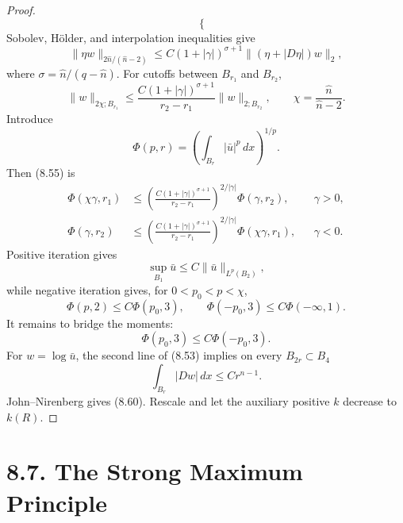 \begin{proof}
\begin{equation}
\begin{cases}
\end{cases}
\end{equation}
Sobolev, H\"older, and interpolation inequalities give
\begin{equation}
\tag{8.54}
\|\eta w\|_{2\widehat n/(\widehat n-2)}
\leq C(1+|\gamma|)^{\sigma+1}
\|(\eta+|D\eta|)w\|_2,
\end{equation}
where $\sigma=\widehat n/(q-\widehat n)$. For cutoffs between
$B_{r_1}$ and $B_{r_2}$,
\begin{equation}
\tag{8.55}
\|w\|_{2\chi;B_{r_1}}
\leq\frac{C(1+|\gamma|)^{\sigma+1}}{r_2-r_1}
\|w\|_{2;B_{r_2}},
\qquad\chi=\frac{\widehat n}{\widehat n-2}.
\end{equation}
Introduce
\begin{equation}
\tag{8.56}
\Phi(p,r)=\left(\int_{B_r}|\bar u|^p\,dx\right)^{1/p}.
\end{equation}
Then (8.55) is
\begin{equation}
\tag{8.57}
\begin{aligned}
\Phi(\chi\gamma,r_1)&\leq
\left(\frac{C(1+|\gamma|)^{\sigma+1}}{r_2-r_1}\right)^{2/|\gamma|}
\Phi(\gamma,r_2),&&\gamma>0,\\
\Phi(\gamma,r_2)&\leq
\left(\frac{C(1+|\gamma|)^{\sigma+1}}{r_2-r_1}\right)^{2/|\gamma|}
\Phi(\chi\gamma,r_1),&&\gamma<0.
\end{aligned}
\end{equation}
Positive iteration gives
\begin{equation}
\tag{8.58}
\sup_{B_1}\bar u\leq C\|\bar u\|_{L^p(B_2)},
\end{equation}
while negative iteration gives, for $0<p_0<p<\chi$,
\begin{equation}
\tag{8.59}
\Phi(p,2)\leq C\Phi(p_0,3),
\qquad\Phi(-p_0,3)\leq C\Phi(-\infty,1).
\end{equation}
It remains to bridge the moments:
\begin{equation}
\tag{8.60}
\Phi(p_0,3)\leq C\Phi(-p_0,3).
\end{equation}
For $w=\log\bar u$, the second line of (8.53) implies on every
$B_{2r}\subset B_4$
\begin{equation}
\tag{8.61}
\int_{B_r}|Dw|\,dx\leq Cr^{n-1}.
\end{equation}
John--Nirenberg gives (8.60). Rescale and let the auxiliary positive $k$
decrease to $k(R)$.
\end{proof}

\section*{8.7. The Strong Maximum Principle}

